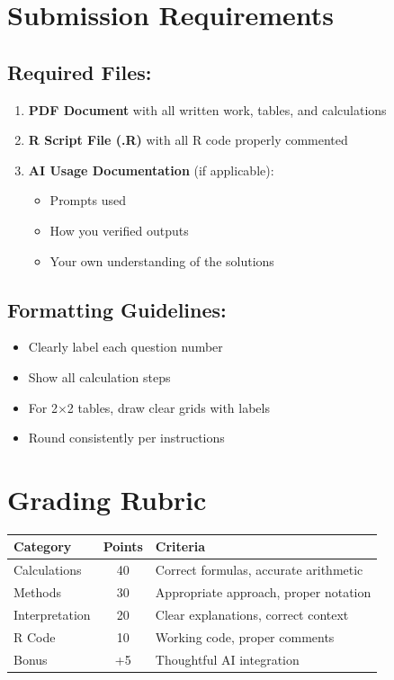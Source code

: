 \documentclass[11pt]{article}
\begin{document}
\vspace{2cm}

\section*{Submission Requirements}

\subsection*{Required Files:}
\begin{enumerate}
\item \textbf{PDF Document} with all written work, tables, and calculations
\item \textbf{R Script File (.R)} with all R code properly commented
\item \textbf{AI Usage Documentation} (if applicable):
   \begin{itemize}
   \item Prompts used
   \item How you verified outputs
   \item Your own understanding of the solutions
   \end{itemize}
\end{enumerate}

\subsection*{Formatting Guidelines:}
\begin{itemize}
\item Clearly label each question number
\item Show all calculation steps
\item For 2$\times$2 tables, draw clear grids with labels
\item Round consistently per instructions
\end{itemize}

\section*{Grading Rubric}

\begin{table}[h]
\centering
\begin{tabular}{lcp{8cm}}
\toprule
\textbf{Category} & \textbf{Points} & \textbf{Criteria} \\
\midrule
Calculations & 40 & Correct formulas, accurate arithmetic \\
Methods & 30 & Appropriate approach, proper notation \\
Interpretation & 20 & Clear explanations, correct context \\
R Code & 10 & Working code, proper comments \\
Bonus & +5 & Thoughtful AI integration \\
\bottomrule
\end{tabular}
\end{table}
\end{document}
